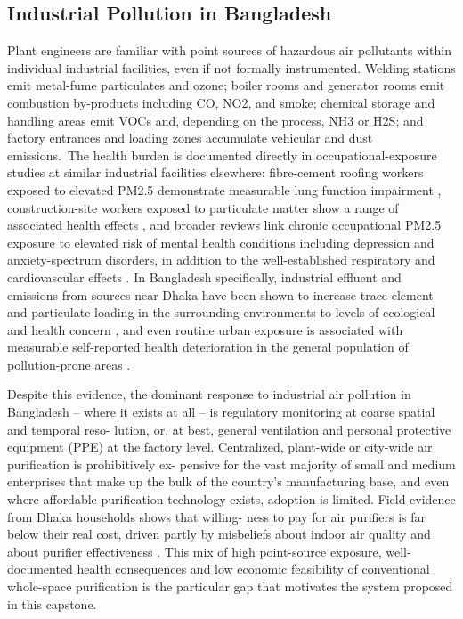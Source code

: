 \subsection{Industrial Pollution in Bangladesh}
\label{sec:industrial-pollution-bd}

Plant engineers are familiar with point sources of hazardous air pollutants within individual industrial facilities, even if not formally instrumented. Welding stations emit metal-fume particulates and ozone; boiler rooms and generator rooms emit combustion by-products including CO, NO2, and smoke; chemical storage and handling areas emit VOCs and, depending on the process, NH3 or H2S; and factory entrances and loading zones accumulate vehicular and dust emissions.\
The health burden is documented directly in occupational-exposure studies at similar industrial facilities elsewhere: fibre-cement roofing workers exposed to elevated PM2.5 demonstrate measurable lung function impairment \citep{nasri2023pm25}, construction-site workers exposed to particulate matter show a range of associated health effects \citep{sekhavati2023particulate}, and broader reviews link chronic occupational PM2.5 exposure to elevated risk of mental health conditions including depression and anxiety-spectrum disorders, in addition to the well-established respiratory and cardiovascular effects \citep{alhadhrami2024pm25mental}. In Bangladesh specifically, industrial effluent and emissions from sources near Dhaka have been shown to increase trace-element and particulate loading in the surrounding environments to levels of ecological and health concern \citep{lisa2025investigative}, and even routine urban exposure is associated with measurable self-reported health deterioration in the general population of pollution-prone areas \citep{rahman2025perceived}.

Despite this evidence, the dominant response to industrial air pollution in Bangladesh – where it exists at all – is regulatory monitoring at coarse spatial and temporal reso- lution, or, at best, general ventilation and personal protective equipment (PPE) at the factory level. Centralized, plant-wide or city-wide air purification is prohibitively ex- pensive for the vast majority of small and medium enterprises that make up the bulk of the country’s manufacturing base, and even where affordable purification technology exists, adoption is limited. Field evidence from Dhaka households shows that willing- ness to pay for air purifiers is far below their real cost, driven partly by misbeliefs about indoor air quality and about purifier effectiveness \citep{chowdhury2025misbeliefs}. This mix of high point-source exposure, well-documented health consequences and low economic feasibility of conventional whole-space purification is the particular gap that motivates the system proposed in this capstone.

